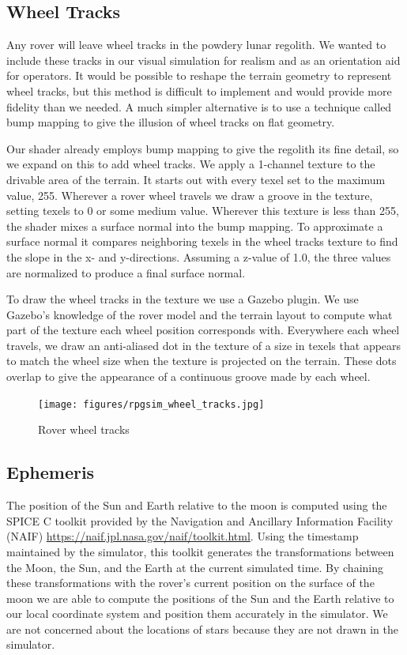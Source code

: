 \documentclass[twocolumn,letterpaper]{IEEEAerospaceCLS}  %
\begin{document}
\subsection{Wheel Tracks}
Any rover will leave wheel tracks in the powdery lunar regolith. We wanted to include these tracks in our visual simulation for realism and as an orientation aid for operators. 
It would be possible to reshape the terrain geometry to represent wheel tracks, but this method is difficult to implement and would provide more fidelity than we needed.
A much simpler alternative is to use a technique called bump mapping to give the illusion of wheel tracks on flat geometry.

Our shader already employs bump mapping to give the regolith its fine detail, so we expand on this to add wheel tracks. 
We apply a 1-channel texture to the drivable area of the terrain.
It starts out with every texel set to the maximum value, 255. 
Wherever a rover wheel travels we draw a groove in the texture, setting texels to 0 or some medium value.
Wherever this texture is less than 255, the shader mixes a surface normal into the bump mapping. 
To approximate a surface normal it compares neighboring texels in the wheel tracks texture to find the slope in the x- and y-directions. 
Assuming a z-value of 1.0, the three values are normalized to produce a final surface normal.

To draw the wheel tracks in the texture we use a Gazebo plugin. 
We use Gazebo's knowledge of the rover model and the terrain layout to compute what part of the texture each wheel position corresponds with. 
Everywhere each wheel travels, we draw an anti-aliased dot in the texture of a size in texels that appears to match the wheel size when the texture is projected on the terrain. 
These dots overlap to give the appearance of a continuous groove made by each wheel.
\begin{figure}[h!]
	\texttt{[image: figures/rpgsim\_wheel\_tracks.jpg]}
   	\caption{Rover wheel tracks}
    \label{fig:wheeltracks}
\end{figure}

\subsection{Ephemeris}
The position of the Sun and Earth relative to the moon is computed using the SPICE C toolkit provided by the Navigation and Ancillary Information Facility (NAIF) \url{https://naif.jpl.nasa.gov/naif/toolkit.html}.  
Using the timestamp maintained by the simulator, this toolkit generates the transformations between the Moon, the Sun, and the Earth at the current simulated time.  
By chaining these transformations with the rover's current position on the surface of the moon we are able to compute the positions of the Sun and the Earth relative to our local coordinate system and position them accurately in the simulator.  
We are not concerned about the locations of stars because they are not drawn in the simulator.
\end{document}
